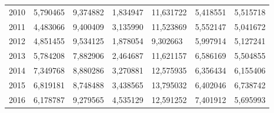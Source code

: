 \begin{table}
\begin{tabular}{p{1cm}p{2cm}p{2cm}p{2cm}p{2cm}p{2cm}p{2cm}}
 2010 &     5,790465 &                            9,374882 &                    1,834947 &                             11,631722 &                        5,418551 & 5,515718 \\
 2011 &     4,483066 &                            9,400409 &                    3,135990 &                             11,523869 &                        5,552147 & 5,041672 \\
 2012 &     4,851455 &                            9,534125 &                    1,878054 &                              9,302663 &                        5,997914 & 5,127241 \\
 2013 &     5,784208 &                            7,882906 &                    2,464687 &                             11,621157 &                        6,586169 & 5,504855 \\
 2014 &     7,349768 &                            8,880286 &                    3,270881 &                             12,575935 &                        6,356434 & 6,155406 \\
 2015 &     6,819181 &                            8,748488 &                    3,438565 &                             13,795032 &                        6,402046 & 6,738742 \\
 2016 &     6,178787 &                            9,279565 &                    4,535129 &                             12,591252 &                        7,401912 & 5,695993 \\
\bottomrule
\end{tabular}
\end{table}
